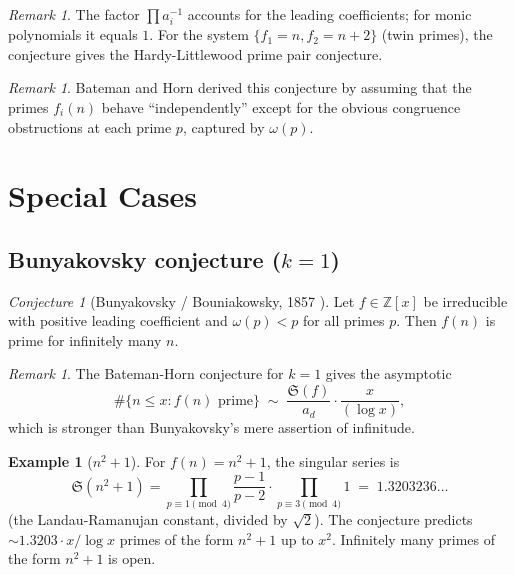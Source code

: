 \documentclass[12pt,a4paper]{amsart}
\theoremstyle{definition}
\newtheorem{example}[theorem]{Example}
\theoremstyle{remark}
\newtheorem{remark}[theorem]{Remark}
\newtheorem{conjecture}[theorem]{Conjecture}
\newcommand{\Z}{\mathbb{Z}}
\newcommand{\BH}{\mathfrak{S}}
\begin{document}
\begin{remark}
  The factor $\prod a_i^{-1}$ accounts for the leading coefficients; for monic
  polynomials it equals $1$. For the system $\{f_1 = n, f_2 = n+2\}$ (twin primes),
  the conjecture gives the Hardy-Littlewood prime pair conjecture.
\end{remark}

\begin{remark}
  Bateman and Horn derived this conjecture by assuming that the primes $f_i(n)$ behave
  ``independently'' except for the obvious congruence obstructions at each prime $p$,
  captured by $\omega(p)$.
\end{remark}

\section{Special Cases}\label{sec:special}

\subsection{Bunyakovsky conjecture ($k=1$)}

\begin{conjecture}[Bunyakovsky / Bouniakowsky, 1857 \cite{Bunyakovsky1857}]
  \label{conj:bunyakovsky}
  Let $f \in \Z[x]$ be irreducible with positive leading coefficient and $\omega(p) < p$
  for all primes $p$. Then $f(n)$ is prime for infinitely many $n$.
\end{conjecture}

\begin{remark}
  The Bateman-Horn conjecture for $k=1$ gives the asymptotic
  \[
    \#\{n \leq x : f(n) \text{ prime}\} \;\sim\;
    \frac{\BH(f)}{a_d} \cdot \frac{x}{(\log x)},
  \]
  which is stronger than Bunyakovsky's mere assertion of infinitude.
\end{remark}

\begin{example}[$n^2+1$]
  For $f(n) = n^2 + 1$, the singular series is
  \[
    \BH(n^2+1) = \prod_{p \equiv 1 \pmod{4}} \frac{p-1}{p-2}
                 \cdot \prod_{p \equiv 3 \pmod{4}} 1
                 \;=\; 1.3203236\ldots
  \]
  (the Landau-Ramanujan constant, divided by $\sqrt{2}$).
  The conjecture predicts $\sim 1.3203 \cdot x / \log x$ primes of the form $n^2+1$ up to $x^2$.
  Infinitely many primes of the form $n^2+1$ is open.
\end{example}
\end{document}
